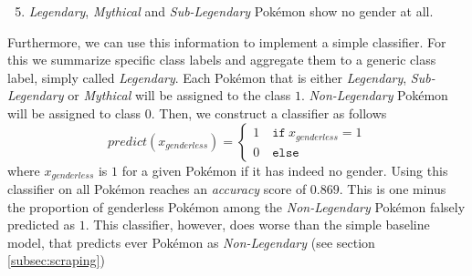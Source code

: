 \documentclass[conference]{IEEEtran}
\begin{document}
\begin{enumerate}
	\setcounter{enumi}{4}
	\item \textit{Legendary}, \textit{Mythical} and \textit{Sub-Legendary} Pokémon show no gender at all.
\end{enumerate}
Furthermore, we can use this information to implement a simple classifier. For this we summarize specific class labels and aggregate them to a generic class label, simply called \textit{Legendary}. Each Pokémon that is either \textit{Legendary}, \textit{Sub-Legendary} or \textit{Mythical} will be assigned to the class $1$. \textit{Non-Legendary} Pokémon will be assigned to class $0$. Then, we construct a classifier as follows
\begin{equation}
	predict(x_{genderless}) = 
	\begin{cases}
		1 \quad \mathtt{if} \ x_{genderless} = 1 \\
		0 \quad \mathtt{else}
	\end{cases}
\end{equation}
where $x_{genderless}$ is $1$ for a given Pokémon if it has indeed no gender. Using this classifier on all Pokémon reaches an \textit{accuracy} score of $0.869$. This is one minus the proportion of genderless Pokémon among the \textit{Non-Legendary} Pokémon falsely predicted as $1$. This classifier, however, does worse than the simple baseline model, that predicts ever Pokémon as \textit{Non-Legendary} (see section \ref{subsec:scraping})
\end{document}
